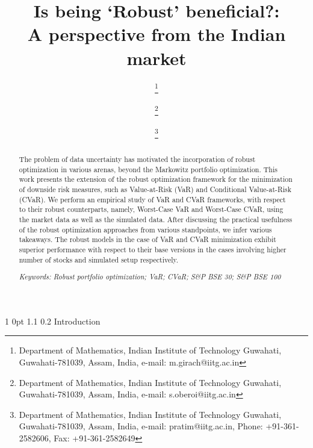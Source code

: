 \documentclass[12pt]{article}
\makeatletter
\numberwithin{equation}{section}
\renewcommand{\section}{
  \@startsection
  {section}%
  {1}%
  {0pt}%
  {1.1\baselineskip}%
  {0.2\baselineskip}%
  {\sc \centering}%
}
\makeatother
\begin{document}
\title{\large\sc Is being `Robust' beneficial?:\\ A perspective from the Indian market}

\normalsize

\author{ \thanks{Department of Mathematics, Indian Institute of Technology Guwahati, Guwahati-781039, Assam, India, e-mail: m.girach@iitg.ac.in}
\and {} \thanks{Department of Mathematics, Indian Institute of Technology Guwahati, Guwahati-781039, Assam, India, e-mail: s.oberoi@iitg.ac.in}
\and {} \thanks{Department of Mathematics, Indian Institute of Technology Guwahati, Guwahati-781039, Assam, India, e-mail: pratim@iitg.ac.in,
Phone: +91-361-2582606, Fax: +91-361-2582649}}
\date{}
\maketitle
\begin{abstract}

The problem of data uncertainty has motivated the incorporation of robust optimization in various arenas, beyond the Markowitz portfolio optimization. This work presents the extension of the robust optimization framework for the minimization of downside risk measures, such as Value-at-Risk (VaR) and Conditional Value-at-Risk (CVaR). We perform an empirical study of VaR and CVaR frameworks, with respect to their robust counterparts, namely, Worst-Case VaR and Worst-Case CVaR, using the market data as well as the simulated data. After discussing the practical usefulness of the robust optimization approaches from various standpoints, we infer various takeaways. The robust models in the case of VaR and CVaR minimization exhibit superior performance with respect to their base versions in the cases involving higher number of stocks and simulated setup respectively.

{\it Keywords: Robust portfolio optimization; VaR; CVaR; S\&P BSE 30; S\&P BSE 100}

\end{abstract}

\section{Introduction}
\label{Introduction}
\end{document}
